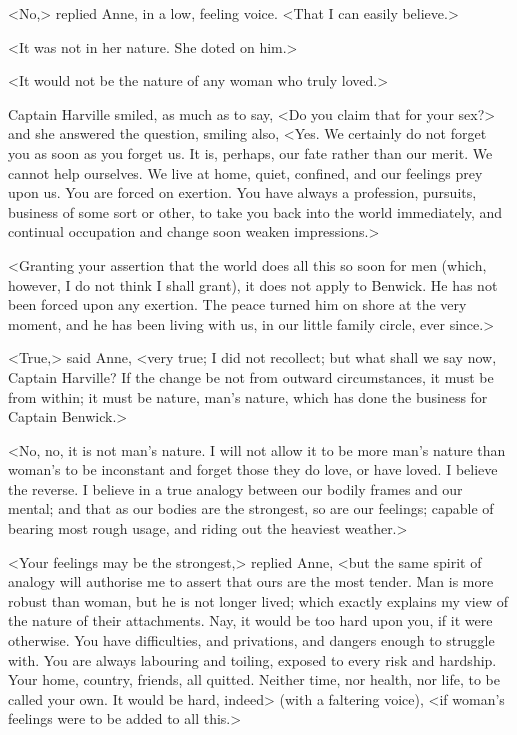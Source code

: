 <No,> replied Anne, in a low, feeling voice. <That I can easily believe.>

<It was not in her nature. She doted on him.>

<It would not be the nature of any woman who truly loved.>

Captain Harville smiled, as much as to say, <Do you claim that for your sex?> and she answered the question, smiling also, <Yes. We certainly do not forget you as soon as you forget us. It is, perhaps, our fate rather than our merit. We cannot help ourselves. We live at home, quiet, confined, and our feelings prey upon us. You are forced on exertion. You have always a profession, pursuits, business of some sort or other, to take you back into the world immediately, and continual occupation and change soon weaken impressions.>

<Granting your assertion that the world does all this so soon for men (which, however, I do not think I shall grant), it does not apply to Benwick. He has not been forced upon any exertion. The peace turned him on shore at the very moment, and he has been living with us, in our little family circle, ever since.>

<True,> said Anne, <very true; I did not recollect; but what shall we say now, Captain Harville? If the change be not from outward circumstances, it must be from within; it must be nature, man's nature, which has done the business for Captain Benwick.>

<No, no, it is not man's nature. I will not allow it to be more man's nature than woman's to be inconstant and forget those they do love, or have loved. I believe the reverse. I believe in a true analogy between our bodily frames and our mental; and that as our bodies are the strongest, so are our feelings; capable of bearing most rough usage, and riding out the heaviest weather.>

<Your feelings may be the strongest,> replied Anne, <but the same spirit of analogy will authorise me to assert that ours are the most tender. Man is more robust than woman, but he is not longer lived; which exactly explains my view of the nature of their attachments. Nay, it would be too hard upon you, if it were otherwise. You have difficulties, and privations, and dangers enough to struggle with. You are always labouring and toiling, exposed to every risk and hardship. Your home, country, friends, all quitted. Neither time, nor health, nor life, to be called your own. It would be hard, indeed> (with a faltering voice), <if woman's feelings were to be added to all this.>

